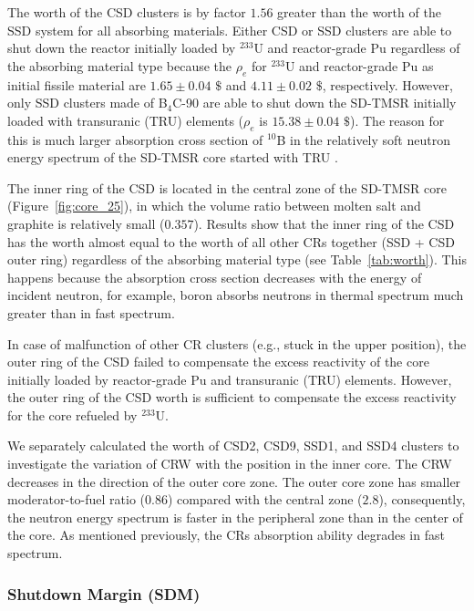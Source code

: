 The worth of the CSD clusters is by factor $1.56$ greater than 
the worth of the SSD system for all absorbing materials. Either CSD or SSD 
clusters are able to shut down the reactor initially loaded by 
$^{233}$U and reactor-grade Pu regardless of the absorbing material type because 
the $\rho_e$ for $^{233}$U and reactor-grade Pu as initial fissile material are $1.65\pm0.04$ 
$\$$ and $4.11\pm0.02$ $\$$, respectively. However, only SSD clusters made of B$_4$C-90 are able to shut down the SD-TMSR 
initially loaded with transuranic (TRU) elements ($\rho_e$ is $15.38\pm0.04$ $\$$). The reason for this is much larger 
absorption cross section of $^{10}$B in the relatively soft neutron energy 
spectrum of the SD-TMSR core started with TRU \cite{ashraf2020Strategies}.

The inner ring of the CSD is located in the central zone of the SD-TMSR core 
(Figure~\ref{fig:core_25}), in which the volume ratio between molten salt and 
graphite is relatively small ($0.357$). Results show that the inner ring of the CSD has 
the worth almost equal to the worth of all other CRs together (SSD + CSD outer ring) regardless of 
the absorbing material type (see Table~\ref{tab:worth}). This happens because the absorption cross section
decreases with the energy of incident neutron, for example, boron absorbs neutrons in thermal spectrum much 
greater than in fast spectrum.

In case of malfunction of other CR clusters (e.g., stuck in the upper 
position), the outer ring of the CSD failed to compensate the excess 
reactivity of the core initially loaded by reactor-grade Pu and transuranic 
(TRU) elements. However, the outer ring of the CSD worth is sufficient 
to compensate the excess reactivity for the core refueled by $^{233}$U. 

We separately calculated the worth of CSD2, CSD9, SSD1, and SSD4 clusters to 
investigate the variation of CRW with the position in the inner core.
The CRW decreases in the direction of the outer core zone. The outer core zone 
has smaller moderator-to-fuel ratio ($0.86$) compared with the central zone 
($2.8$), consequently, the neutron energy spectrum is faster in the peripheral 
zone than in the center of the core. As mentioned previously, the CRs 
absorption ability degrades in fast spectrum.

\subsubsection{Shutdown Margin (SDM)}

